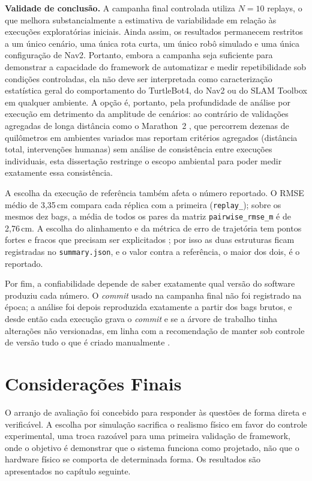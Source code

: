 \textbf{Validade de conclusão.} A campanha final controlada utiliza $N=10$
replays, o que melhora substancialmente a estimativa de variabilidade em relação
às execuções exploratórias iniciais. Ainda assim, os resultados permanecem
restritos a um único cenário, uma única rota curta, um único robô simulado e uma
única configuração de Nav2. Portanto, embora a campanha seja suficiente para
demonstrar a capacidade do framework de automatizar e medir repetibilidade sob
condições controladas, ela não deve ser interpretada como caracterização
estatística geral do comportamento do TurtleBot4, do Nav2 ou do SLAM Toolbox em
qualquer ambiente. A opção é, portanto, pela profundidade de análise por
execução em detrimento da amplitude de cenários: ao contrário de validações
agregadas de longa distância como o Marathon~2 \cite{macenski2020marathon},
que percorrem dezenas de quilômetros em ambientes variados mas reportam
critérios agregados (distância total, intervenções humanas) sem análise de
consistência entre execuções individuais, esta dissertação restringe o
escopo ambiental para poder medir exatamente essa consistência.

A escolha da execução de referência também afeta o número reportado. O RMSE
médio de 3,35\,cm compara cada réplica com a primeira (\texttt{replay\_});
sobre os mesmos dez bags, a média de todos os pares da matriz
\texttt{pairwise\_\allowbreak rmse\_\allowbreak m} é de 2,76\,cm. A escolha do alinhamento
e da métrica de erro de trajetória tem pontos fortes e fracos que precisam ser
explicitados \cite{zhang2018trajectory}; por isso as duas
estruturas ficam registradas no \texttt{summary.json}, e o valor contra a
referência, o maior dos dois, é o reportado.

Por fim, a confiabilidade depende de saber exatamente qual versão do
software produziu cada número. O \textit{commit} usado na campanha final não
foi registrado na época; a análise foi depois reproduzida exatamente a partir
dos bags brutos, e desde então cada execução grava o \textit{commit} e se a
árvore de trabalho tinha alterações não versionadas, em linha com a
recomendação de manter sob controle de versão tudo o que é criado
manualmente \cite{wilson2014}.

\section{Considerações Finais}
\label{sec:aval_conclusao}

O arranjo de avaliação foi concebido para responder às questões de forma direta e
verificável. A escolha por simulação sacrifica o realismo físico em favor do controle
experimental, uma troca razoável para uma primeira validação de framework,
onde o objetivo é demonstrar que o sistema funciona como projetado, não que o
hardware físico se comporta de determinada forma. Os resultados são apresentados
no capítulo seguinte.
